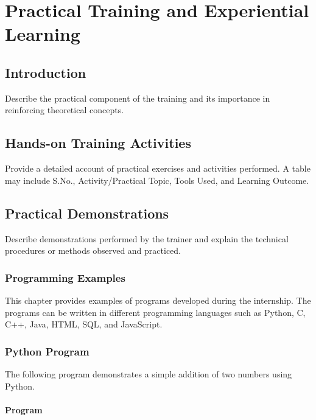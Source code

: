 \chapter{Practical Training and Experiential Learning}

\section{Introduction}
Describe the practical component of the training and its importance in reinforcing theoretical concepts.

\section{Hands-on Training Activities}
Provide a detailed account of practical exercises and activities performed. A table may include S.No., Activity/Practical Topic, Tools Used, and Learning Outcome.

\section{Practical Demonstrations}
Describe demonstrations performed by the trainer and explain the technical procedures or methods observed and practiced.


\subsection{Programming Examples}

This chapter provides examples of programs developed during
the internship. The programs can be written in different
programming languages such as Python, C, C++, Java, HTML,
SQL, and JavaScript.


\subsection{Python Program}

The following program demonstrates a simple addition of two
numbers using Python.

\subsubsection{Program}

